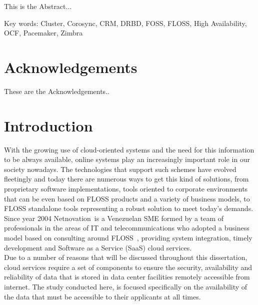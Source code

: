 \documentclass[a4paper, 12pt]{book}
\begin{document}
This is the Abstract...

\noindent
Key words: Cluster, Corosync, CRM, DRBD, FOSS, FLOSS, High Availability, OCF, Pacemaker, Zimbra

%
\chapter*{Acknowledgements}
\label{chap:acknowledgements}

These are the Acknowledgements..

%
\tableofcontents  	%
\listoffigures  	%
\listoftables 		%

%
\chapter{Introduction}
\label{chap:introduction}

\noindent With the growing use of cloud-oriented systems and the need for this information to be always available, online systems play an increasingly important role in our society nowadays. The technologies that support such schemes have evolved fleetingly and today there are numerous ways to get this kind of solutions, from proprietary software implementations, tools oriented to corporate environments that can be even based on FLOSS products and a variety of business models, to FLOSS standalone tools representing a robust solution to meet today's demands.\\

\noindent Since year 2004 Netnovation\texttrademark \ is a Venezuelan SME formed by a team of professionals in the areas of IT and telecommunications who adopted a business model based on consulting around FLOSS~\cite{Daffara2}, providing system integration, timely development and Software as a Service (SaaS) cloud services.\\

\noindent Due to a number of reasons that will be discussed throughout this dissertation, cloud services require a set of components to ensure the security, availability and reliability of data that is stored in data center facilities remotely accessible from internet. The study conducted here, is focused specifically on the availability of the data that must be accessible to their applicants at all times.\\
\end{document}
